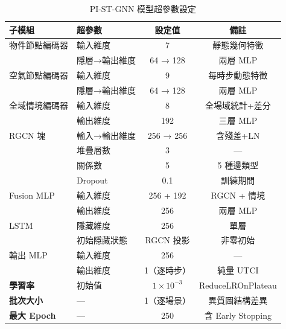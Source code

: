 \begin{table}[htbp]
    \centering
    \caption{PI-ST-GNN 模型超參數設定}
    \label{tab:model_params}
    \small
    \begin{tabular}{llcc}
        \toprule
        \textbf{子模組} & \textbf{超參數} & \textbf{設定值} & \textbf{備註} \\
        \midrule
        物件節點編碼器     & 輸入維度         & 7          & 靜態幾何特徵 \\
                          & 隱層→輸出維度   & 64 → 128   & 兩層 MLP \\
        空氣節點編碼器     & 輸入維度         & 9          & 每時步動態特徵 \\
                          & 隱層→輸出維度   & 64 → 128   & 兩層 MLP \\
        全域情境編碼器     & 輸入維度         & 8          & 全場域統計+差分 \\
                          & 輸出維度         & 192        & 三層 MLP \\
        RGCN 塊            & 輸入→輸出維度   & 256 → 256  & 含殘差+LN \\
                          & 堆疊層數         & 3          & --- \\
                          & 關係數           & 5          & 5 種邊類型 \\
                          & Dropout          & 0.1        & 訓練期間 \\
        Fusion MLP         & 輸入維度         & 256 + 192  & RGCN + 情境 \\
                          & 輸出維度         & 256        & 兩層 MLP \\
        LSTM               & 隱藏維度         & 256        & 單層 \\
                          & 初始隱藏狀態     & RGCN 投影  & 非零初始 \\
        輸出 MLP           & 輸入維度         & 256        & --- \\
                          & 輸出維度         & 1（逐時步）& 純量 UTCI \\
        \midrule
        \textbf{學習率}   & 初始值           & $1 \times 10^{-3}$ & ReduceLROnPlateau \\
        \textbf{批次大小} & ---              & 1（逐場景） & 異質圖結構差異 \\
        \textbf{最大 Epoch} & ---            & 250         & 含 Early Stopping \\
        \bottomrule
    \end{tabular}
\end{table}


